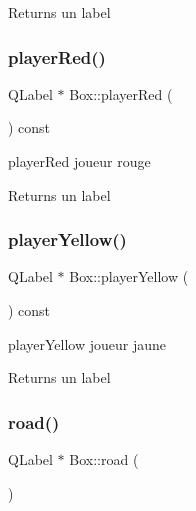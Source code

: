 \begin{DoxyReturn}{Returns}
un label 
\end{DoxyReturn}
\mbox{\label{class_box_a2c7957bb93e1d75369c185b23a9b5b1c}} 
\subsubsection{\texorpdfstring{player\+Red()}{playerRed()}}
{\footnotesize\ttfamily Q\+Label $\ast$ Box\+::player\+Red (\begin{DoxyParamCaption}{ }\end{DoxyParamCaption}) const\hspace{0.3cm}{\ttfamily [inline]}}



player\+Red joueur rouge 

\begin{DoxyReturn}{Returns}
un label 
\end{DoxyReturn}
\mbox{\label{class_box_a4e5e1a2e7f098dddf12db8354c717ecd}} 
\subsubsection{\texorpdfstring{player\+Yellow()}{playerYellow()}}
{\footnotesize\ttfamily Q\+Label $\ast$ Box\+::player\+Yellow (\begin{DoxyParamCaption}{ }\end{DoxyParamCaption}) const\hspace{0.3cm}{\ttfamily [inline]}}



player\+Yellow joueur jaune 

\begin{DoxyReturn}{Returns}
un label 
\end{DoxyReturn}
\mbox{\label{class_box_aaae920c6f391a06e38e781297ec0b204}} 
\subsubsection{\texorpdfstring{road()}{road()}}
{\footnotesize\ttfamily Q\+Label $\ast$ Box\+::road (\begin{DoxyParamCaption}{ }\end{DoxyParamCaption})\hspace{0.3cm}{\ttfamily [inline]}}



